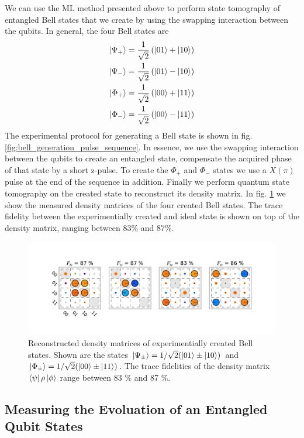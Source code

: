 We can use the ML method presented above to perform state tomography of entangled Bell states that we create by using the swapping interaction between the qubits. In general, the four Bell states are
%
\begin{eqnarray}
\left| \Psi_+ \right> = \frac{1}{\sqrt{2}}\left(\left| 01 \right>+\left| 10 \right>\right) \\
\left| \Psi_- \right> = \frac{1}{\sqrt{2}}\left(\left| 01 \right>-\left| 10 \right>\right) \\
\left| \Phi_+ \right> = \frac{1}{\sqrt{2}}\left(\left| 00 \right>+\left| 11 \right>\right) \\
\left| \Phi_- \right> = \frac{1}{\sqrt{2}}\left(\left| 00 \right>-\left| 11 \right>\right)
\end{eqnarray}
%
The experimental protocol for generating a Bell state is shown in fig. \ref{fig:bell_generation_pulse_sequence}. In essence, we use the swapping interaction between the qubits to create an entangled state, compensate the acquired phase of that state by a short z-pulse. To create the $\Phi_+$ and $\Phi_-$ states we use a $X(\pi)$ pulse at the end of the sequence in addition. Finally we perform quantum state tomography on the created state to reconstruct its density matrix. In fig. \ref{fig:bell_states} we show the measured density matrices of the four created Bell states. The trace fidelity between the experimentially created and ideal state is shown on top of the density matrix, ranging between $83 \%$ and $87 \%$.

\begin{figure}[ht!]
  \flushright
	\includegraphics[width=1\textwidth]{"./data/ct5/2011_02_09 preparation of bell states/bell matrices"}
	\caption{Reconstructed density matrices of experimentially created Bell states. Shown are the states $\left| \Psi_\pm \right>=1/\sqrt{2}(\left| 01 \right>\pm\left| 10 \right>)$ and $\left| \Phi_\pm \right>=1/\sqrt{2}(\left| 00 \right>\pm\left| 11 \right>)$. The trace fidelities of the density matrix $\left< \psi \right|\rho\left| \phi \right>$ range between 83 \% and 87 \%.}
	\label{fig:bell_states}
\end{figure}

\subsection{Measuring the Evoluation of an Entangled Qubit States}

